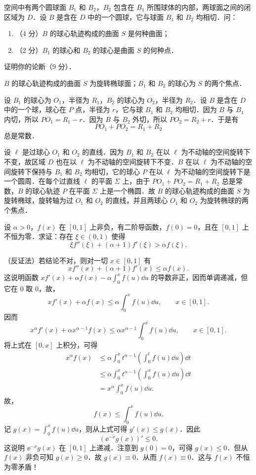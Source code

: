 
空间中有两个圆球面 $B_1$ 和 $B_2$，$B_2$ 包含在 $B_1$ 所围球体的内部，两球面之间的闭区域为 $D$．设 $B$ 是含在 $D$ 中的一个圆球，它与球面 $B_1$ 和 $B_2$ 均相切．问：
\begin{enumerate}[label=(\roman*)]
  \item（4 分）$B$ 的球心轨迹构成的曲面 $S$ 是何种曲面；
  \item（2 分）$B_1$ 的球心和 $B_2$ 的球心是曲面 $S$ 的何种点．
\end{enumerate}
证明你的论断（9 分）．

\begin{solution}
$B$ 的球心轨迹构成的曲面 $S$ 为旋转椭球面；$B_1$ 和 $B_2$ 的球心为 $S$ 的两个焦点．

设 $B_1$ 的球心为 $O_1$，半径为 $R_1$，$B_2$ 的球心为 $O_2$，半径为 $R_2$．设 $B$ 是含在 $D$ 中的一个球，球心在 $P$ 点，半径为 $r$，它与球 $B_1$ 和 $B_2$ 均相切．因为 $B$ 与 $B_1$ 内切，所以 $PO_1=R_1-r$．因为 $B$ 与 $B_2$ 外切，所以 $PO_2=R_2+r$．于是有
\[
  PO_1+PO_2=R_1+R_2
\]
总是常数．

设 $\ell$ 是过球心 $O_1$ 和 $O_2$ 的直线．因为 $B_1$ 和 $B_2$ 在以 $\ell$ 为不动轴的空间旋转下不变，故区域 $D$ 也在以 $\ell$ 为不动轴的空间旋转下不变．$B$ 在以 $\ell$ 为不动轴的空间旋转下保持与 $B_1$ 和 $B_2$ 均相切，它的球心 $P$ 在以 $\ell$ 为不动轴的空间旋转下是一个圆周．在每个过直线 $\ell$ 的平面 $\Sigma$ 上，由于 $PO_1+PO_2=R_1+R_2$ 总是常数，$B$ 的球心轨迹 $P$ 在平面 $\Sigma$ 上是一个椭圆．故 $B$ 的球心轨迹构成的曲面 $S$ 为旋转椭球，旋转轴为过 $O_1$ 和 $O_2$ 的直线，并且两球心 $O_1$ 和 $O_2$ 为旋转椭球的两个焦点．
\end{solution}

设 $\alpha>0$，$f(x)$ 在 $[0,1]$ 上非负，有二阶导函数，$f(0)=0$，且在 $[0,1]$ 上不恒为零．求证：存在 $\xi\in(0,1)$ 使得
\[
  \xi f''(\xi)+(\alpha+1)f'(\xi)>\alpha f(\xi).
\]

\begin{solution}
（反证法）若结论不对，则对一切 $x\in[0,1]$ 有
\[
  xf''(x)+(\alpha+1)f'(x)\le\alpha f(x).
\]
这说明函数 $xf'(x)+\alpha f(x)-\alpha\int_0^x f(u)\dd u$ 的导数非正，因而单调递减，但它在 $0$ 取 $0$，故，
\[
  xf'(x)+\alpha f(x)\le\alpha\int_0^x f(u)\dd u,\qquad x\in[0,1].
\]
因而
\[
  x^{\alpha}f'(x)+\alpha x^{\alpha-1}f(x)\le\alpha x^{\alpha-1}\int_0^x f(u)\dd u,\qquad x\in[0,1].
\]
将上式在 $[0,x]$ 上积分，可得
\begin{align*}
  x^{\alpha}f(x)&\le\alpha\int_0^x t^{\alpha-1}\left(\int_0^t f(u)\dd u\right)\dd t\\
  &\le\alpha\int_0^x t^{\alpha-1}\left(\int_0^x f(u)\dd u\right)\dd t\\
  &=x^{\alpha}\int_0^x f(u)\dd u.
\end{align*}
故，
\[
  f(x)\le\int_0^x f(u)\dd u.
\]
记 $g(x)=\int_0^x f(u)\dd u$，则从上式可得 $g'(x)\le g(x)$．因此
\[
  (\ee^{-x}g(x))'\le0.
\]
这说明 $\ee^{-x}g(x)$ 在 $[0,1]$ 上递减．注意到 $g(0)=0$，可得 $g(x)\le0$．但从 $f(x)$ 非负可知 $g(x)\ge0$．故 $g(x)\equiv0$．从而 $f(x)\equiv0$．这与 $f(x)$ 不恒为零矛盾！
\end{solution}

